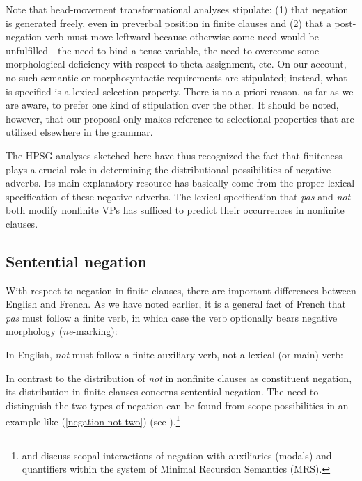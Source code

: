 \documentclass[output=paper
                ,modfonts
                ,nonflat
	        ,collection
	        ,collectionchapter
	        ,collectiontoclongg
 	        ,biblatex
                ,babelshorthands
                ,newtxmath
                ,draftmode
                ,colorlinks, citecolor=brown
]{./langsci/langscibook}
\begin{document}
{\begin{exe}
\begin{xlist}
\begin{exe}
\begin{xlist}
Note that head-movement transformational analyses stipulate: (1) that negation
is generated freely, even in preverbal position in finite clauses and (2) that
a post-negation verb must move leftward because otherwise some need would be
unfulfilled---the need to bind a tense variable, the need to overcome some
morphological deficiency with respect to theta assignment, etc. On our
account, no such semantic or morphosyntactic requirements are stipulated;
instead, what is specified is a lexical selection property. There is no a
priori reason, as far as we are aware, to prefer one kind of stipulation over
the other. It should be noted, however, that our proposal only makes reference
to selectional properties that are utilized elsewhere in the grammar.
\fi


The HPSG analyses sketched here have thus recognized
the fact that finiteness plays a crucial role in
determining the distributional possibilities of negative
adverbs. Its main explanatory resource
has basically come from the proper lexical specification of these negative
adverbs. The lexical specification that \textit{pas} and
\textit{not} both modify nonfinite VPs has sufficed to predict their
occurrences in nonfinite clauses.



\subsection{Sentential negation}
\label{sec-sentential-negation}

With respect to negation in finite clauses, there are important differences between English and French.
As we have noted earlier, it is a general fact of French that \textit{pas} must follow a finite verb, in which case the verb optionally bears negative morphology (\textit{ne}-marking):

\eal
{}
\zl
\noindent
In English, \textit{not} must follow a finite
auxiliary verb, not a lexical (or main) verb:

\eal
{}
\zl

In contrast to the distribution of \textit{not}
 in nonfinite clauses as constituent negation, its distribution
 in finite clauses concerns sentential
 negation.
  The need to distinguish the two types of negation can be found from scope
possibilities in an example like (\ref{negation-not-two}) (see \citealt{Klima:64, Baker:89, Warner2000a-u}).\footnote{\citet{Warner2000a-u} and \citet{BL:13}
discuss scopal interactions of negation with auxiliaries (modals) and quantifiers
within the system of Minimal Recursion Semantics (MRS).}


\end{xlist}
\end{exe}
\end{xlist}
\end{exe}}
\end{document}
